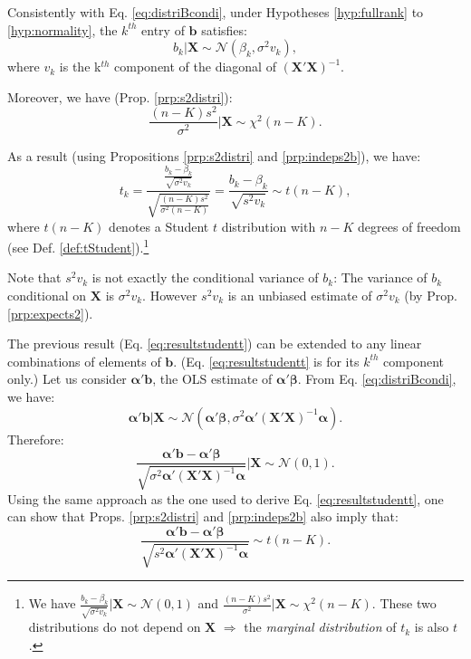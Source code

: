 \documentclass[
  11pt,
]{book}
\theoremstyle{definition}
\theoremstyle{definition}
\theoremstyle{definition}
\theoremstyle{definition}
\theoremstyle{remark}
\begin{document}
Consistently with Eq. \eqref{eq:distriBcondi}, under Hypotheses \ref{hyp:fullrank} to \ref{hyp:normality}, the \(k^{th}\) entry of \(\mathbf{b}\) satisfies:
\[
b_k | \mathbf{X} \sim \mathcal{N}(\beta_k,\sigma^2 v_k),
\]
where \(v_k\) is the k\(^{th}\) component of the diagonal of \((\mathbf{X}'\mathbf{X})^{-1}\).

Moreover, we have (Prop. \ref{prp:s2distri}):
\[
\frac{(n-K)s^2}{\sigma^2} | \mathbf{X} \sim \chi ^2 (n-K).
\]

As a result (using Propositions \ref{prp:s2distri} and \ref{prp:indeps2b}), we have:
\begin{equation}
\boxed{t_k = \frac{\frac{b_k - \beta_k}{\sqrt{\sigma^2 v_k}}}{\sqrt{\frac{(n-K)s^2}{\sigma^2(n-K)}}} = \frac{b_k - \beta_k}{\sqrt{s^2v_k}} \sim t(n-K),}\label{eq:resultstudentt}
\end{equation}
where \(t(n-K)\) denotes a Student \(t\) distribution with \(n-K\) degrees of freedom (see Def. \ref{def:tStudent}).\footnote{We have \(\frac{b_k - \beta_k}{\sqrt{\sigma^2 v_k}} | \mathbf{X} \sim \mathcal{N}(0,1)\) and \(\frac{(n-K)s^2}{\sigma^2} | \mathbf{X} \sim \chi ^2 (n-K)\). These two distributions do not depend on \(\mathbf{X}\) \(\Rightarrow\) the \emph{marginal distribution} of \(t_k\) is also \(t\).}

Note that \(s^2 v_k\) is not exactly the conditional variance of \(b_k\): The variance of \(b_k\) conditional on \(\mathbf{X}\) is \(\sigma^2 v_k\). However \(s^2 v_k\) is an unbiased estimate of \(\sigma^2 v_k\) (by Prop. \ref{prp:expects2}).

The previous result (Eq. \eqref{eq:resultstudentt}) can be extended to any linear combinations of elements of \(\mathbf{b}\). (Eq. \eqref{eq:resultstudentt} is for its \(k^{th}\) component only.) Let us consider \(\boldsymbol\alpha'\mathbf{b}\), the OLS estimate of \(\boldsymbol\alpha'\boldsymbol\beta\). From Eq. \eqref{eq:distriBcondi}, we have:
\[
\boldsymbol\alpha'\mathbf{b} | \mathbf{X} \sim \mathcal{N}(\boldsymbol\alpha'\boldsymbol\beta,\sigma^2 \boldsymbol\alpha'(\mathbf{X}'\mathbf{X})^{-1}\boldsymbol\alpha).
\]
Therefore:
\[
\frac{\boldsymbol\alpha'\mathbf{b} - \boldsymbol\alpha'\boldsymbol\beta}{\sqrt{\sigma^2 \boldsymbol\alpha'(\mathbf{X}'\mathbf{X})^{-1}\boldsymbol\alpha}} | \mathbf{X} \sim \mathcal{N}(0,1).
\]
Using the same approach as the one used to derive Eq. \eqref{eq:resultstudentt}, one can show that Props. \ref{prp:s2distri} and \ref{prp:indeps2b} also imply that:
\begin{equation}
\boxed{\frac{\boldsymbol\alpha'\mathbf{b} - \boldsymbol\alpha'\boldsymbol\beta}{\sqrt{s^2\boldsymbol\alpha'(\mathbf{X}'\mathbf{X})^{-1}\boldsymbol\alpha}} \sim t(n-K).}\label{eq:resultstudentt2}
\end{equation}
\end{document}
